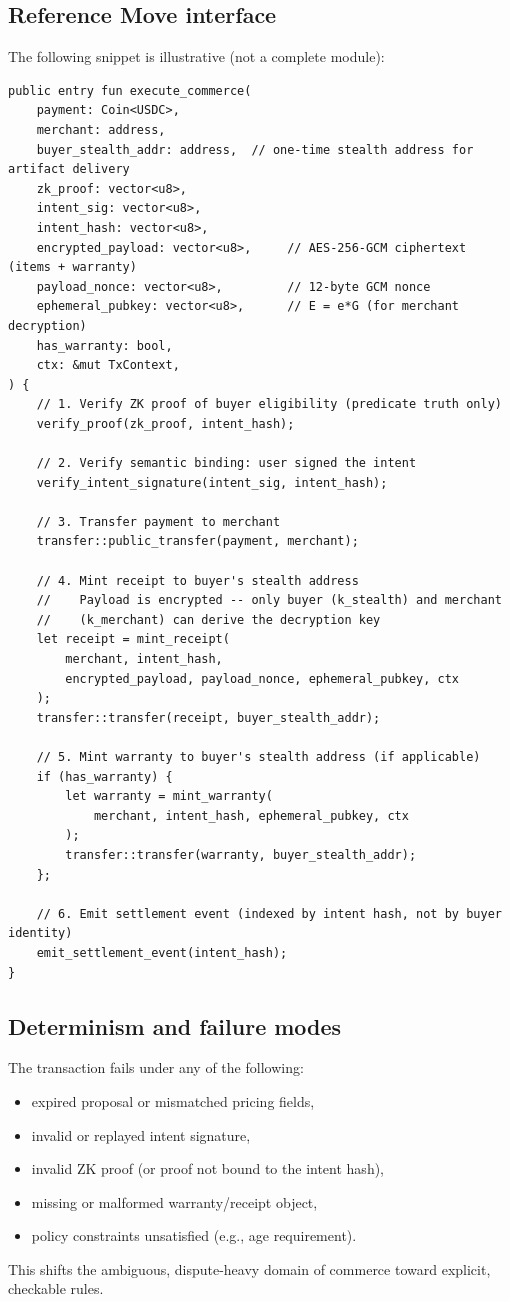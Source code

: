 \documentclass[11pt]{article}
\begin{document}
\subsection{Reference Move interface}
The following snippet is illustrative (not a complete module):
\begin{lstlisting}[language=Move]
public entry fun execute_commerce(
    payment: Coin<USDC>,
    merchant: address,
    buyer_stealth_addr: address,  // one-time stealth address for artifact delivery
    zk_proof: vector<u8>,
    intent_sig: vector<u8>,
    intent_hash: vector<u8>,
    encrypted_payload: vector<u8>,     // AES-256-GCM ciphertext (items + warranty)
    payload_nonce: vector<u8>,         // 12-byte GCM nonce
    ephemeral_pubkey: vector<u8>,      // E = e*G (for merchant decryption)
    has_warranty: bool,
    ctx: &mut TxContext,
) {
    // 1. Verify ZK proof of buyer eligibility (predicate truth only)
    verify_proof(zk_proof, intent_hash);

    // 2. Verify semantic binding: user signed the intent
    verify_intent_signature(intent_sig, intent_hash);

    // 3. Transfer payment to merchant
    transfer::public_transfer(payment, merchant);

    // 4. Mint receipt to buyer's stealth address
    //    Payload is encrypted -- only buyer (k_stealth) and merchant
    //    (k_merchant) can derive the decryption key
    let receipt = mint_receipt(
        merchant, intent_hash,
        encrypted_payload, payload_nonce, ephemeral_pubkey, ctx
    );
    transfer::transfer(receipt, buyer_stealth_addr);

    // 5. Mint warranty to buyer's stealth address (if applicable)
    if (has_warranty) {
        let warranty = mint_warranty(
            merchant, intent_hash, ephemeral_pubkey, ctx
        );
        transfer::transfer(warranty, buyer_stealth_addr);
    };

    // 6. Emit settlement event (indexed by intent hash, not by buyer identity)
    emit_settlement_event(intent_hash);
}
\end{lstlisting}

\subsection{Determinism and failure modes}
The transaction fails under any of the following:
\begin{itemize}
  \item expired proposal or mismatched pricing fields,
  \item invalid or replayed intent signature,
  \item invalid ZK proof (or proof not bound to the intent hash),
  \item missing or malformed warranty/receipt object,
  \item policy constraints unsatisfied (e.g., age requirement).
\end{itemize}
This shifts the ambiguous, dispute-heavy domain of commerce toward explicit, checkable rules.
\end{document}
